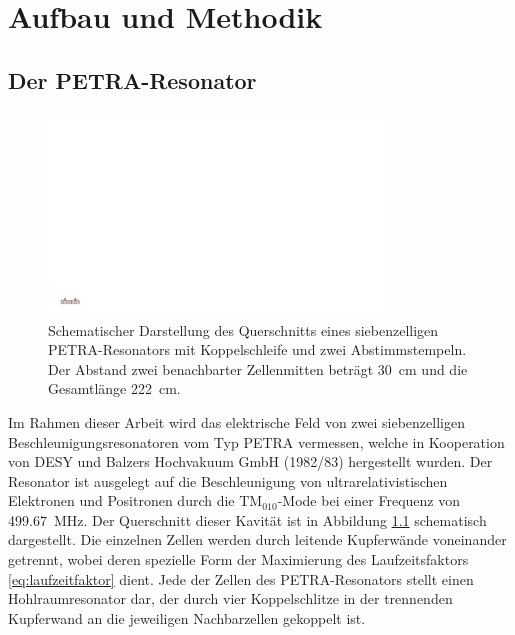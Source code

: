 \chapter{Aufbau und Methodik}
\label{sec:aufbau_und_methodik}


\section{Der PETRA-Resonator}
\begin{figure}[htb]
  \centering
  \includegraphics[width=0.8\textwidth]{./figs/cavity/cavity.pdf}
  \caption{Schematischer Darstellung des Querschnitts eines siebenzelligen PETRA-Resonators mit Koppelschleife und zwei Abstimmstempeln. Der Abstand zwei benachbarter Zellenmitten beträgt \SI{30}{\centi\metre} und die Gesamtlänge \SI{222}{\centi\metre}.}
  \label{fig:petra_cavity}
\end{figure}
Im Rahmen dieser Arbeit wird das elektrische Feld von zwei siebenzelligen Beschleunigungsresonatoren vom Typ PETRA \cite{desy_petra} vermessen, welche in Kooperation von DESY und Balzers Hochvakuum GmbH (1982/83) hergestellt wurden.
Der Resonator ist ausgelegt auf die Beschleunigung von ultrarelativistischen Elektronen und Positronen durch die $\mathrm{TM}_{010}$-Mode bei einer Frequenz von \SI{499.67}{MHz}.
Der Querschnitt dieser Kavität ist in Abbildung \ref{fig:petra_cavity} schematisch dargestellt.
Die einzelnen Zellen werden durch leitende Kupferwände voneinander getrennt, wobei deren spezielle Form der Maximierung des Laufzeitsfaktors \eqref{eq:laufzeitfaktor} dient.
Jede der Zellen des PETRA-Resonators stellt einen Hohlraumresonator dar, der durch vier Koppelschlitze in der trennenden Kupferwand an die jeweiligen Nachbarzellen gekoppelt ist.
